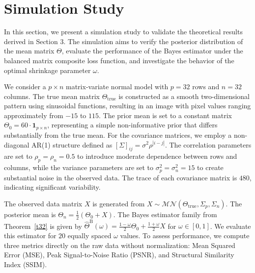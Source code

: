 \documentclass[twoside]{article}
\begin{document}
\section{Simulation Study}
In this section, we present a simulation study to validate the theoretical results derived in Section 3. The simulation aims to verify the posterior distribution of the mean matrix $\Theta$, evaluate the performance of the Bayes estimator under the balanced matrix composite loss function, and investigate the behavior of the optimal shrinkage parameter $\omega$.

We consider a $p \times n$ matrix-variate normal model with $p = 32$ rows and $n = 32$ columns. The true mean matrix $\Theta_{\text{true}}$ is constructed as a smooth two-dimensional pattern using sinusoidal functions, resulting in an image with pixel values ranging approximately from $-15$ to $115$. The prior mean is set to a constant matrix $\Theta_0 = 60 \cdot \mathbf{1}_{p \times n}$, representing a simple non-informative prior that differs substantially from the true mean.
For the covariance matrices, we employ a non-diagonal AR(1) structure defined as $[\Sigma]_{ij} = \sigma^2 \rho^{|i-j|}$. The correlation parameters are set to $\rho_p = \rho_n = 0.5$ to introduce moderate dependence between rows and columns, while the variance parameters are set to $\sigma^2_p = \sigma^2_n = 15$ to create substantial noise in the observed data. The trace of each covariance matrix is $480$, indicating significant variability.

The observed data matrix $X$ is generated from $X \sim \mathcal{MN}(\Theta_{\text{true}}, \Sigma_p, \Sigma_n)$. The posterior mean is $\Theta_n = \frac{1}{2}(\Theta_0 + X)$. The Bayes estimator family from Theorem~\ref{t32}  is given by $\hat{\Theta}^{\mathrm{B}}(\omega) = \frac{1-\omega}{2}\Theta_0 + \frac{1+\omega}{2}X$ for $\omega \in [0,1]$. We evaluate this estimator for $20$ equally spaced $\omega$ values. To assess performance, we compute three metrics directly on the raw data without normalization: Mean Squared Error (MSE), Peak Signal-to-Noise Ratio (PSNR), and Structural Similarity Index (SSIM).
\end{document}
